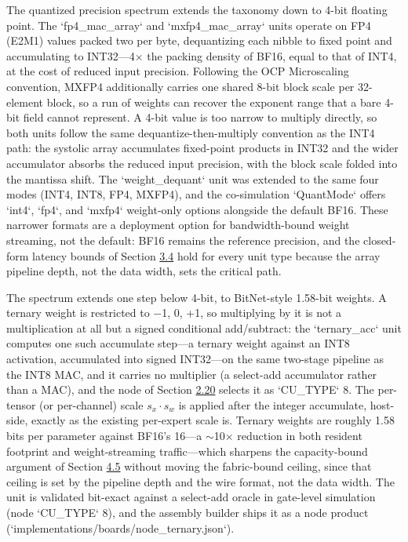 \documentclass[10pt,twocolumn]{article}
\begin{document}
The quantized precision spectrum extends the taxonomy down to 4-bit floating point. The `fp4\_mac\_array` and `mxfp4\_mac\_array` units operate on FP4 (E2M1) values packed two per byte, dequantizing each nibble to fixed point and accumulating to INT32---4$\times$ the packing density of BF16, equal to that of INT4, at the cost of reduced input precision. Following the OCP Microscaling convention, MXFP4 additionally carries one shared 8-bit block scale per 32-element block, so a run of weights can recover the exponent range that a bare 4-bit field cannot represent. A 4-bit value is too narrow to multiply directly, so both units follow the same dequantize-then-multiply convention as the INT4 path: the systolic array accumulates fixed-point products in INT32 and the wider accumulator absorbs the reduced input precision, with the block scale folded into the mantissa shift. The `weight\_dequant` unit was extended to the same four modes (INT4, INT8, FP4, MXFP4), and the co-simulation `QuantMode` offers `int4`, `fp4`, and `mxfp4` weight-only options alongside the default BF16. These narrower formats are a deployment option for bandwidth-bound weight streaming, not the default: BF16 remains the reference precision, and the closed-form latency bounds of Section \hyperref[sec:3.4]{3.4} hold for every unit type because the array pipeline depth, not the data width, sets the critical path.

The spectrum extends one step below 4-bit, to BitNet-style 1.58-bit weights\cite{42}. A ternary weight is restricted to {$-$1, 0, +1}, so multiplying by it is not a multiplication at all but a signed conditional add/subtract: the `ternary\_acc` unit computes one such accumulate step---a ternary weight against an INT8 activation, accumulated into signed INT32---on the same two-stage pipeline as the INT8 MAC, and it carries no multiplier (a select-add accumulator rather than a MAC), and the node of Section \hyperref[sec:2.20]{2.20} selects it as `CU\_TYPE` 8. The per-tensor (or per-channel) scale $s_x\cdot s_w$ is applied after the integer accumulate, host-side, exactly as the existing per-expert scale is. Ternary weights are roughly 1.58 bits per parameter against BF16's 16---a $\sim$10$\times$ reduction in both resident footprint and weight-streaming traffic---which sharpens the capacity-bound argument of Section \hyperref[sec:4.5]{4.5} without moving the fabric-bound ceiling, since that ceiling is set by the pipeline depth and the wire format, not the data width. The unit is validated bit-exact against a select-add oracle in gate-level simulation (node `CU\_TYPE` 8), and the assembly builder ships it as a node product (`implementations/boards/node\_ternary.json`).
\end{document}
